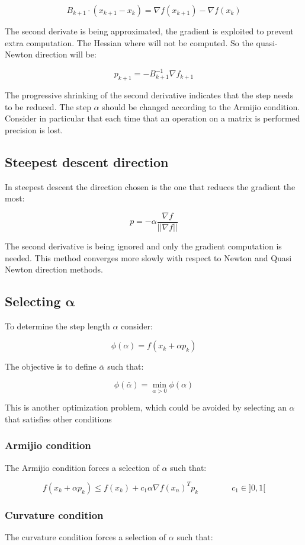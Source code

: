   $$B_{k+1}\cdot (x_{k+1}-x_k) = \nabla f(x_{k+1})-\nabla f(x_k)$$

  The second derivate is being approximated, the gradient is exploited to prevent extra computation.
  The Hessian where will not be computed.
  So the quasi-Newton direction will be:

  $$p_{k+1} = -B_{k+1}^{-1}\nabla f_{k+1}$$

  The progressive shrinking of the second derivative indicates that the step needs to be reduced.
  The step $\alpha$ should be changed according to the Armijio condition.
  Consider in particular that each time that an operation on a matrix is performed precision is lost.

  \subsection{Steepest descent direction}
  In steepest descent the direction chosen is the one that reduces the gradient the most:

  $$p= -\alpha \frac{\nabla f}{||\nabla f||}$$

  The second derivative is being ignored and only the gradient computation is needed.
  This method converges more slowly with respect to Newton and Quasi Newton direction methods.

  \subsection{Selecting $\mathbf{\alpha}$}
  To determine the step length $\alpha$ consider:

  $$\phi(\alpha) = f(x_k + \alpha p_k)$$

  The objective is to define $\bar{\alpha}$ such that:

  $$\phi(\bar{\alpha}) = \min\limits_{\alpha>0}\phi(\alpha)$$

  This is another optimization problem, which could be avoided by selecting an $\alpha$ that satisfies other conditions

    \subsubsection{Armijio condition}
    The Armijio condition forces a selection of $\alpha$ such that:

    $$f(x_k+\alpha p_k) \leq f(x_k) + c_1\alpha \nabla f(x_n)^T p_k\qquad\qquad c_1 \in ]0,1[$$

    \subsubsection{Curvature condition}
    The curvature condition forces a selection of $\alpha$ such that:

